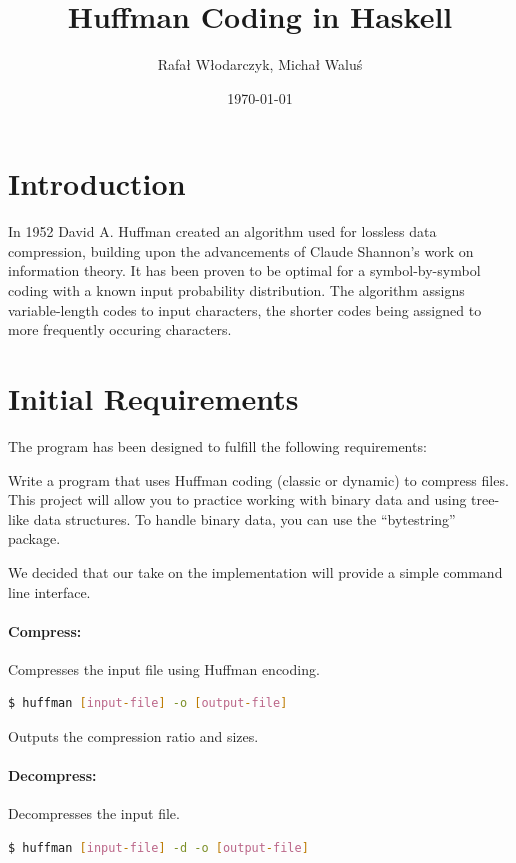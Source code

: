 \documentclass{article}
\begin{document}
\title{Huffman Coding in Haskell}
\author{Rafał Włodarczyk, Michał Waluś}
\date{\today}

\maketitle

\tableofcontents
\newpage

\section{Introduction}

In 1952 David A. Huffman created an algorithm used for lossless data compression, 
building upon the advancements of Claude Shannon's work on information theory.
It has been proven to be optimal for a symbol-by-symbol coding with a known 
input probability distribution. The algorithm assigns variable-length codes to 
input characters, the shorter codes being assigned to more frequently occuring characters.

\section{Initial Requirements}

The program has been designed to fulfill the following requirements:

Write a program that uses Huffman coding (classic or dynamic) to compress files.
This project will allow you to practice working with binary data and using tree-like data structures.
To handle binary data, you can use the “bytestring” package.

We decided that our take on the implementation will provide a simple command line interface.

\paragraph{Compress:} Compresses the input file using Huffman encoding.
\begin{lstlisting}[language=bash]
$ huffman [input-file] -o [output-file]
\end{lstlisting}
Outputs the compression ratio and sizes.

\paragraph{Decompress:} Decompresses the input file.
\begin{lstlisting}[language=bash]
$ huffman [input-file] -d -o [output-file]
\end{lstlisting}
\end{document}
